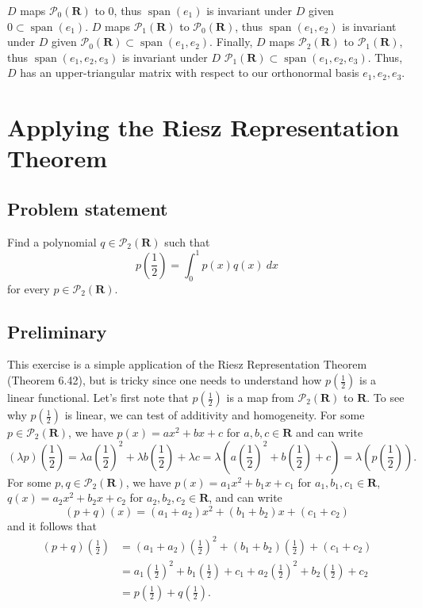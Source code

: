 \documentclass{article}
\begin{document}
$D$ maps $\mathcal{P}_0(\mathbf{R})$ to $0$, thus $\operatorname{span}(e_1)$ is invariant under $D$ given $0\subset \operatorname{span}(e_1)$. 
$D$ maps $\mathcal{P}_1(\mathbf{R})$ to $\mathcal{P}_0(\mathbf{R})$, thus $\operatorname{span}(e_1,e_2)$ is invariant under $D$ given \newline$\mathcal{P}_0(\mathbf{R})\subset\operatorname{span}(e_1,e_2)$. 
Finally, $D$ maps $\mathcal{P}_2(\mathbf{R})$ to $\mathcal{P}_1(\mathbf{R})$, thus $\operatorname{span}(e_1,e_2,e_3)$ is invariant under $D$ $\mathcal{P}_1(\mathbf{R})\subset\operatorname{span}(e_1,e_2,e_3)$. 
Thus, $D$ has an upper-triangular matrix with respect to our orthonormal basis $e_1,e_2,e_3$. 

\clearpage

\section{Applying the Riesz Representation Theorem}
\subsection*{Problem statement}
Find a polynomial $q\in\mathcal{P}_2(\mathbf{R})$ such that
\[p(\frac{1}{2})=\int_0^1p(x)q(x)\ dx\]
for every $p\in\mathcal{P}_2(\mathbf{R})$.

\subsection*{Preliminary}
This exercise is a simple application of the Riesz Representation Theorem (Theorem 6.42), but is tricky since one needs to understand how $p(\frac{1}{2})$ is a linear functional. 
Let's first note that $p(\frac{1}{2})$ is a map from $\mathcal{P}_2(\mathbf{R})$ to $\mathbf{R}$. 
To see why $p(\frac{1}{2})$ is linear, we can test of additivity and homogeneity. 
For some $p\in\mathcal{P}_2(\mathbf{R})$, we have $p(x)=ax^2+bx+c$ for $a,b,c\in\mathbf{R}$ and can write
\[(\lambda p)(\frac{1}{2})=\lambda a(\frac{1}{2})^2+\lambda b(\frac{1}{2})+\lambda c=\lambda(a(\frac{1}{2})^2+ b(\frac{1}{2})+ c)=\lambda(p(\frac{1}{2})).\]
For some $p,q\in\mathcal{P}_2(\mathbf{R})$, we have $p(x)=a_1x^2+b_1x+c_1$ for $a_1,b_1,c_1\in\mathbf{R}$, $q(x)=a_2x^2+b_2x+c_2$ for $a_2,b_2,c_2\in\mathbf{R}$, and can write
\[(p+q)(x)=(a_1+a_2)x^2+(b_1+b_2)x+(c_1+c_2)\]
and it follows that
\begin{align*}
    (p+q)(\frac{1}{2})&=(a_1+a_2)(\frac{1}{2})^2+(b_1+b_2)(\frac{1}{2})+(c_1+c_2)\\
    &=a_1(\frac{1}{2})^2+b_1(\frac{1}{2})+c_1+a_2(\frac{1}{2})^2+b_2(\frac{1}{2})+c_2\\
    &=p(\frac{1}{2})+q(\frac{1}{2}).
\end{align*}
\end{document}

